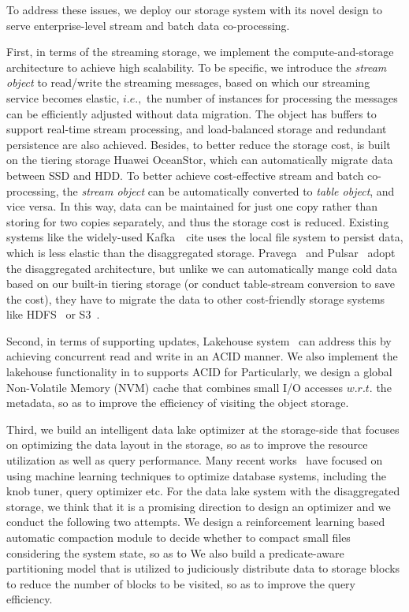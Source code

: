 To address these issues, we deploy our \sys storage system with its novel design to serve enterprise-level  stream and batch data co-processing.


First, in terms of the streaming storage, we implement the compute-and-storage  architecture to achieve high scalability. To be specific, 
 we introduce the \textit{stream object}  to read/write the streaming messages, based on which our streaming service becomes elastic, $i.e.,$ the number of instances for processing the messages can be efficiently adjusted without data migration. The object has buffers to support real-time stream processing, and load-balanced storage and redundant persistence are also achieved. 
Besides, to better reduce the storage cost,  \sys is built on the tiering storage Huawei OceanStor, which can automatically migrate data between SSD and HDD.
To better achieve cost-effective stream and batch co-processing, the \textit{stream object}  can be automatically converted  to  \textit{table object}, and vice versa. In this way, data can be maintained for just one copy rather than storing for two copies separately, and thus the storage cost is reduced. 
Existing systems like the widely-used Kafka~\ cite{} uses the local file system to persist data, which is less elastic than the disaggregated storage.  Pravega~\cite{} and Pulsar~\cite{} adopt the 
disaggregated architecture, but unlike we can automatically mange cold data based on our built-in tiering storage (or conduct table-stream conversion to save the cost), they have to migrate the data to other cost-friendly storage systems like  HDFS~\cite{} or S3~\cite{}.




Second, in terms of supporting updates, Lakehouse system~\cite{} can address this by achieving concurrent read and write in an ACID manner. We also implement the lakehouse functionality in \sys to supports ACID for  Particularly, we design a global Non-Volatile Memory (NVM) cache that combines small I/O accesses $w.r.t.$ the metadata, so as to improve the efficiency of visiting the object storage.

Third,  we build an intelligent data lake optimizer \brain at the storage-side that focuses on optimizing the data layout in the storage, so as to improve the resource utilization as well as  query performance. Many recent works~\cc{}  have focused on using machine learning techniques to  optimize database systems, including the knob tuner, query optimizer etc. For the data lake system with the disaggregated storage, we think that it is a promising direction to design an optimizer and we conduct the following two attempts.
 We design a reinforcement learning based automatic compaction module  to decide whether to compact small files considering the system state, so as to  We also build a predicate-aware partitioning model that is utilized to judiciously distribute data to storage blocks to reduce the number of blocks to be visited, so as to improve the query efficiency.  

